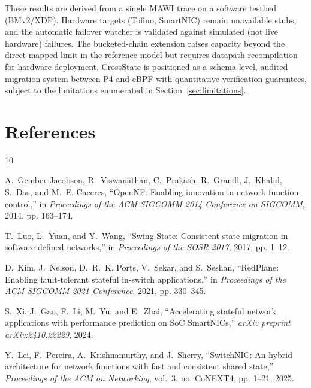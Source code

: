 \documentclass[10pt, conference, compsoc]{IEEEtran}
\begin{document}
These results are derived from a single MAWI trace on a software testbed
(BMv2/XDP). Hardware targets (Tofino, SmartNIC) remain unavailable stubs, and
the automatic failover watcher is validated against simulated (not live
hardware) failures. The bucketed-chain extension raises capacity beyond the
direct-mapped limit in the reference model but requires datapath
recompilation for hardware deployment. CrossState is positioned as a
schema-level, audited migration system between P4 and eBPF with quantitative
verification guarantees, subject to the limitations enumerated in
Section~\ref{sec:limitations}.

\section*{References}
\begin{thebibliography}{10}

A.~Gember-Jacobson, R.~Viswanathan, C.~Prakash, R.~Grandl, J.~Khalid, S.~Das,
and M.~E. Caceres, ``OpenNF: Enabling innovation in network function control,''
in \emph{Proceedings of the ACM SIGCOMM 2014 Conference on SIGCOMM}, 2014,
pp. 163--174.

T.~Luo, L.~Yuan, and Y.~Wang, ``Swing State: Consistent state migration in
software-defined networks,'' in \emph{Proceedings of the SOSR 2017}, 2017,
pp. 1--12.

D.~Kim, J.~Nelson, D.~R.~K. Ports, V.~Sekar, and S.~Seshan, ``RedPlane:
Enabling fault-tolerant stateful in-switch applications,'' in
\emph{Proceedings of the ACM SIGCOMM 2021 Conference}, 2021, pp. 330--345.

S.~Xi, J.~Gao, F.~Li, M.~Yu, and E.~Zhai, ``Accelerating stateful network
applications with performance prediction on SoC SmartNICs,''
\emph{arXiv preprint arXiv:2410.22229}, 2024.

Y.~Lei, F.~Pereira, A.~Krishnamurthy, and J.~Sherry, ``SwitchNIC: An hybrid
architecture for network functions with fast and consistent shared state,''
\emph{Proceedings of the ACM on Networking}, vol.~3, no. CoNEXT4, pp. 1--21,
2025.

\end{thebibliography}
\end{document}
